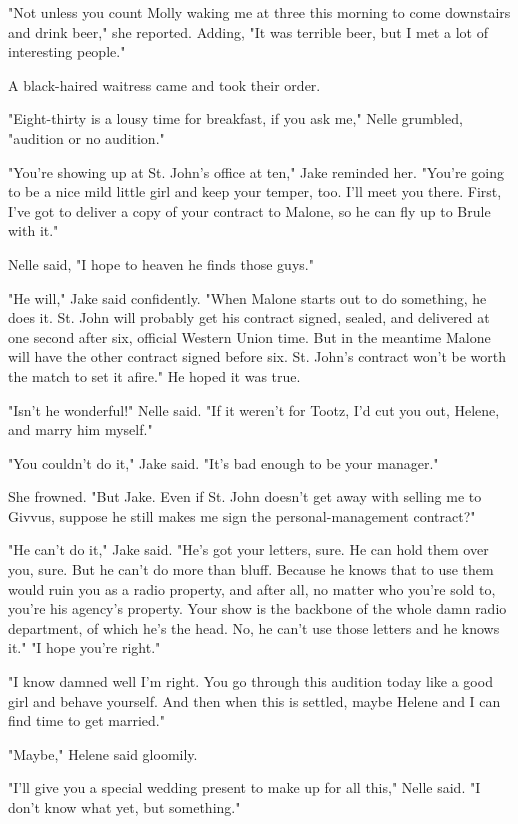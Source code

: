 \documentclass{novel}
\begin{document}
"Not unless you count Molly waking me at three this morning to come downstairs and drink beer," she reported. Adding, "It was terrible beer, but I met a lot of interesting people."

A black-haired waitress came and took their order.

"Eight-thirty is a lousy time for breakfast, if you ask me," Nelle grumbled, "audition or no audition."

"You're showing up at St. John's office at ten," Jake reminded her. "You're going to be a nice mild little girl and keep your temper, too. I'll meet you there. First, I've got to deliver a copy of your contract to Malone, so he can fly up to Brule with it."

Nelle said, "I hope to heaven he finds those guys."

"He will," Jake said confidently. "When Malone starts out to do something, he does it. St. John will probably get his contract signed, sealed, and delivered at one second after six, official Western Union time. But in the meantime Malone will have the other contract signed before six. St. John's contract won't be worth the match to set it afire." He hoped it was true.

"Isn't he wonderful!" Nelle said. "If it weren't for Tootz, I'd cut you out, Helene, and marry him myself."

"You couldn't do it," Jake said. "It's bad enough to be your manager."

She frowned. "But Jake. Even if St. John doesn't get away with selling me to Givvus, suppose he still makes me sign the personal-management contract?"

"He can't do it," Jake said. "He's got your letters, sure. He can hold them over you, sure. But he can't do more than bluff. Because he knows that to use them would ruin you as a radio property, and after all, no matter who you're sold to, you're his agency's property. Your show is the backbone of the whole damn radio department, of which he's the head. No, he can't use those letters and he knows it." "I hope you're right."

"I know damned well I'm right. You go through this audition today like a good girl and behave yourself. And then when this is settled, maybe Helene and I can find time to get married."

"Maybe," Helene said gloomily.

"I'll give you a special wedding present to make up for all this," Nelle said. "I don't know what yet, but something."
\end{document}
